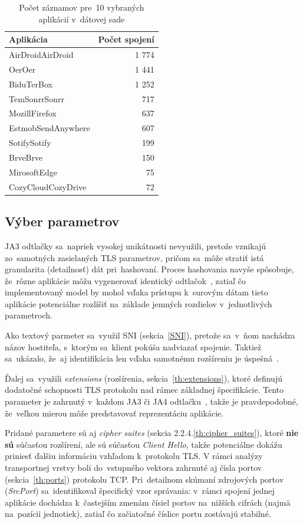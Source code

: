 \begin{table}[ht]
\centering
\caption{Počet záznamov pre~10 vybraných aplikácií v~dátovej sade}
\label{tab:top_app_connections}
\begin{tabular}{lr}
\toprule
\textbf{Aplikácia} & \textbf{Počet spojení} \\ \midrule
AirDroidAirDroid   & 1 774 \\
OerOer             & 1 441 \\
BiduTerBox         & 1 252 \\
TemSonrrSonrr      & 717   \\
MozillFirefox      & 637   \\
EstmobSendAnywhere & 607   \\
SotifySotify & 199 \\
BrveBrve & 150 \\
MirosoftEdge & 75 \\
CozyCloudCozyDrive & 72 \\
\bottomrule
\end{tabular}
\end{table}

\subsection{Výber parametrov}\label{emb:choose_params}
JA3 odtlačky sa~napriek vysokej unikátnosti nevyužili, pretože vznikajú zo~samotných zasielaných TLS parametrov, pričom sa~môže stratiť istá granularita (detailnosť) dát pri~hashovaní. Proces hashovania navyše spôsobuje, že~rôzne aplikácie môžu vygenerovať identický odtlačok~\cite{app_identification}, zatiaľ čo implementovaný model by mohol vďaka prístupu k~surovým dátam tieto aplikácie potenciálne rozlíšiť na~základe jemných rozdielov v~jednotlivých parametroch.

Ako textový parmeter sa~využil SNI (sekcia~\ref{SNI}), pretože sa~v~ňom nachádza názov hostiteľa, s~ktorým sa~klient pokúša nadviazať spojenie. Taktiež sa~ukázalo, že~aj identifikácia len vďaka samotnému rozšíreniu je úspešná~\cite{app_identification}.

Ďalej sa~využili \textit{extensions} (rozšírenia, sekcia~\ref{th:extensions}), ktoré definujú dodatočné schopnosti TLS protokolu nad rámec základnej špecifikácie. Tento parameter je zahrnutý v~každom JA3 či JA4 odtlačku~\cite{app_identification}, takže je pravdepodobné, že~veľkou mierou môže predstavovať reprezentáciu aplikácie.

Pridané parametere sú aj \textit{cipher suites} (sekcia 2.2.4.\ref{th:cipher_suites}), ktoré \textbf{nie sú} súčasťou rozšírení, ale sú súčasťou \textit{Client Hello}, takže potenciálne dokážu priniesť ďalšiu informáciu vzhľadom k~protokolu TLS.
\label{emb:portNumbers}
V rámci analýzy transportnej vrstvy boli do~vstupného vektora zahrnuté aj čísla portov (sekcia~\ref{th:ports}) protokolu TCP. Pri~detailnom skúmaní zdrojových portov (\textit{SrcPort}) sa~identifikoval špecifický vzor správania: v~rámci spojení jednej aplikácie dochádza k~častejším zmenám čísiel portov na~nižších cifrách (najmä na~pozícii jednotiek), zatiaľ čo začiatočné číslice portu zostávajú stabilné. 

